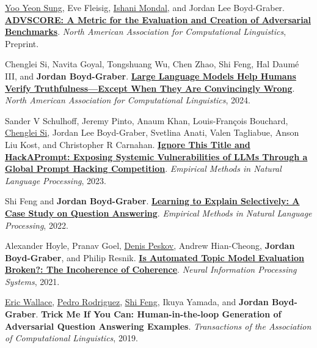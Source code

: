 \documentclass[10pt,a4paper]{article} %
\begin{document}
\begin{multicols}{2}  %

\small

\begin{enumerate*}

\item  \underline{\href{http://yysung.github.io/}{Yoo Yeon Sung}}, Eve
  Fleisig, \underline{\href{https://ishani-mondal.github.io/}{Ishani Mondal}},
  and Jordan Lee Boyd-Graber.  {\bf
    \href{http://cs.umd.edu/~jbg/docs/2025_naacl_advscore.pdf}{ADVSCORE: A
      Metric for the Evaluation and Creation of Adversarial Benchmarks}}.
  \emph{North American Association for Computational Linguistics}, Preprint.
 
\item Chenglei Si, Navita Goyal, Tongshuang Wu, Chen Zhao, Shi Feng, Hal Daum\'{e} {III}, and {\bf Jordan Boyd-Graber}.  {\bf \href{http://cs.umd.edu/~jbg//docs/2024_naacl_convincingly.pdf}{Large Language Models Help Humans Verify Truthfulness---Except When They Are Convincingly Wrong}}.  \emph{North American Association for Computational Linguistics}, 2024.
  
\item Sander V Schulhoff, Jeremy Pinto, Anaum Khan, Louis-François Bouchard, \underline{\href{https://noviscl.github.io/}{Chenglei Si}}, Jordan Lee Boyd-Graber, Svetlina Anati, Valen Tagliabue, Anson Liu Kost, and Christopher R Carnahan.  {\bf \href{http://umiacs.umd.edu/~jbg//docs/2023_emnlp_hackaprompt.pdf}{Ignore This Title and HackAPrompt: Exposing Systemic Vulnerabilities of LLMs Through a Global Prompt Hacking Competition}}.  \emph{Empirical Methods in Natural Language Processing}, 2023.

\item Shi Feng and {\bf Jordan Boyd-Graber}.  {\bf \href{http://cs.umd.edu/~jbg//docs/2022_emnlp_augment.pdf}{Learning to Explain Selectively: A Case Study on Question Answering}}.  \emph{Empirical Methods in Natural Language Processing}, 2022.
  
	 \item Alexander Hoyle, Pranav Goel, \underline{\href{http://denispeskov.github.io/}{Denis Peskov}}, Andrew Hian-Cheong, {\bf Jordan Boyd-Graber}, and Philip Resnik.  {\bf \href{http://umiacs.umd.edu/~jbg//docs/2021_neurips_incoherence.pdf}{Is Automated Topic Model Evaluation Broken?: The Incoherence of Coherence}}.  \emph{Neural Information Processing Systems}, 2021.

  
\item \underline{\href{http://www.ericswallace.com/}{Eric Wallace}}, \underline{\href{https://www.pedro.ai}{Pedro Rodriguez}}, \underline{\href{http://users.umiacs.umd.edu/~shifeng/}{Shi Feng}}, Ikuya Yamada, and {\bf Jordan Boyd-Graber}.  {\bf Trick Me If You Can: Human-in-the-loop Generation of Adversarial Question Answering Examples}.  \emph{Transactions of the Association of Computational Linguistics}, 2019.


\end{enumerate*}
\end{multicols}
\end{document}
